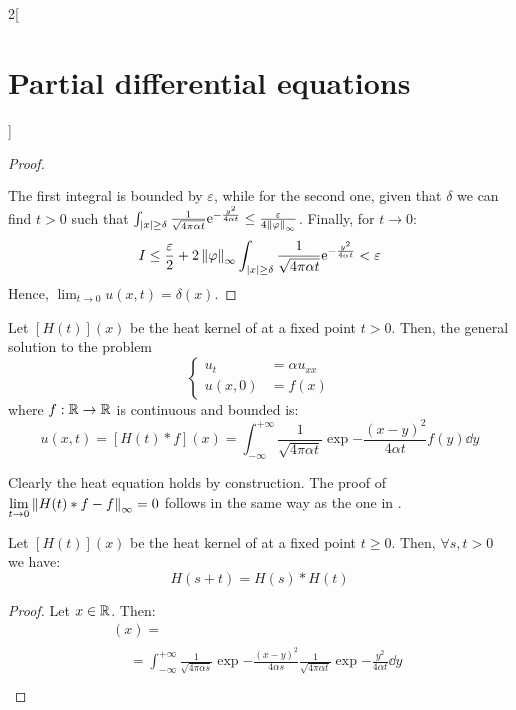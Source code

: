 \documentclass[../../../main_math.tex]{subfiles}
\begin{document}
\begin{multicols}{2}[\section{Partial differential equations}]
\begin{proof}
\begin{align*}
\begin{split}
      \end{split}
    \end{align*}
    The first integral is bounded by $\varepsilon$, while for the second one, given that $\delta$ we can find $t>0$ such that $\int_{\abs{x}\geq\delta}\frac{1}{\sqrt{4\pi\alpha t}}\mathrm{e}^{-\frac{y^2}{4\alpha t}}\leq \frac{\varepsilon}{4\left\|\varphi\right\|_\infty}$. Finally, for $t\to 0$:
    $$I\leq \frac{\varepsilon}{2} + 2\left\|\varphi\right\|_\infty\int_{\abs{x}\geq\delta}\frac{1}{\sqrt{4\pi\alpha t}}\mathrm{e}^{-\frac{y^2}{4\alpha t}}<\varepsilon$$
    Hence, $\displaystyle\lim_{t\to 0}u(x,t)=\delta(x)$.
  \end{proof}
  \begin{corollary}\label{PDE:heatgeneralcoro}
    Let $[H(t)](x)$ be the heat kernel of  at a fixed point $t>0$. Then, the general solution to the problem
    \begin{equation}\label{PDE:heatgeneral}
      \left\{
      \begin{aligned}
        u_{t}  & =\alpha u_{xx} \\
        u(x,0) & =f(x)
      \end{aligned}
      \right.
    \end{equation}
    where $f:\mathbb{R}\rightarrow\mathbb{R}$ is continuous and bounded is: $$u(x,t)=[H(t)*f](x)=\int_{-\infty}^{+\infty}\frac{1}{\sqrt{4\pi\alpha t}}\exp{-\frac{{(x - y)}^2}{4\alpha t}}f(y)\dd{y}$$
  \end{corollary}
  \begin{sproof}
    Clearly the heat equation holds by construction. The proof of $\displaystyle\lim_{t\to 0}\left\|H(t)*f - f\right\|_\infty=0$ follows in the same way as the one in .
  \end{sproof}
  \begin{proposition}
    Let $[H(t)](x)$ be the heat kernel of  at a fixed point $t\geq 0$. Then, $\forall s,t>0$ we have: $$H(s+t)=H(s)*H(t)$$
  \end{proposition}
  \begin{proof}
    Let $x\in\mathbb{R}$. Then:
    \begin{multline*}
      [H(s)*H(t)](x) =       \\
      \begin{aligned}
         & =\int_{-\infty}^{+\infty}\frac{1}{\sqrt{4\pi\alpha s}}\exp{-\frac{{(x-y)}^2}{4\alpha s}}\frac{1}{\sqrt{4\pi\alpha t}}\exp{-\frac{y^2}{4\alpha t}}\dd{y}                                                    \\

\end{aligned}
\end{multline*}
\end{proof}
\end{multicols}
\end{document}
